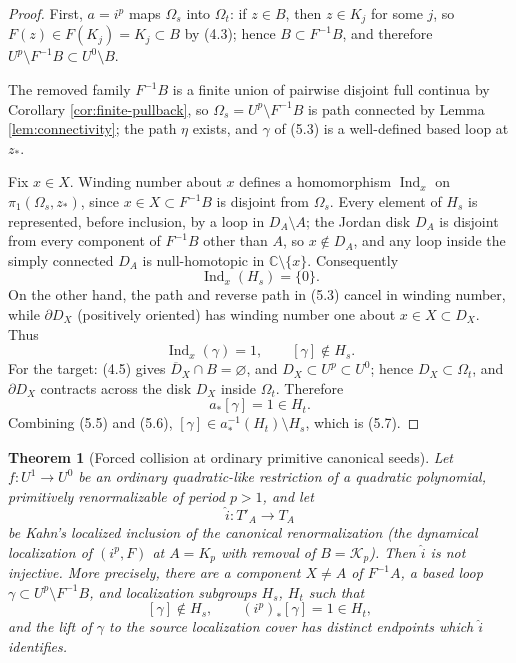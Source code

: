 \documentclass[11pt,reqno]{amsart}
\newtheorem{theorem}{Theorem}[section]
\theoremstyle{definition}
\theoremstyle{remark}
\begin{document}
\begin{proof}
First, \(a=i^p\) maps \(\Omega_s\) into \(\Omega_t\): if \(z\in B\), then \(z\in K_j\) for some \(j\), so \(F(z)\in F(K_j)=K_j\subset B\) by (4.3); hence \(B\subset F^{-1}B\), and therefore \(U^p\setminus F^{-1}B\subset U^0\setminus B\).

The removed family \(F^{-1}B\) is a finite union of pairwise disjoint full continua by Corollary \ref{cor:finite-pullback}, so \(\Omega_s=U^p\setminus F^{-1}B\) is path connected by Lemma \ref{lem:connectivity}; the path \(\eta\) exists, and \(\gamma\) of (5.3) is a well-defined based loop at \(z_*\).

Fix \(x\in X\).  Winding number about \(x\) defines a homomorphism \(\operatorname{Ind}_x\) on \(\pi_1(\Omega_s,z_*)\), since \(x\in X\subset F^{-1}B\) is disjoint from \(\Omega_s\).  Every element of \(H_s\) is represented, before inclusion, by a loop in \(D_A\setminus A\); the Jordan disk \(D_A\) is disjoint from every component of \(F^{-1}B\) other than \(A\), so \(x\notin D_A\), and any loop inside the simply connected \(D_A\) is null-homotopic in \(\mathbb C\setminus\{x\}\).  Consequently
\[
 \operatorname{Ind}_x(H_s)=\{0\}.                     \tag{5.4}
\]
On the other hand, the path and reverse path in (5.3) cancel in winding number, while \(\partial D_X\) (positively oriented) has winding number one about \(x\in X\subset D_X\).  Thus
\[
 \operatorname{Ind}_x(\gamma)=1,\qquad [\gamma]\notin H_s.  \tag{5.5}
\]
For the target: (4.5) gives \(\overline D_X\cap B=\varnothing\), and \(D_X\subset U^p\subset U^0\); hence \(D_X\subset\Omega_t\), and \(\partial D_X\) contracts across the disk \(D_X\) inside \(\Omega_t\).  Therefore
\[
 a_*[\gamma]=1\in H_t.                                \tag{5.6}
\]
Combining (5.5) and (5.6), \([\gamma]\in a_*^{-1}(H_t)\setminus H_s\), which is (5.7).
\end{proof}
\begin{theorem}[Forced collision at ordinary primitive canonical seeds]\label{thm:forced-collision}
Let \(f\colon U^1\to U^0\) be an ordinary quadratic-like restriction of a quadratic polynomial, primitively renormalizable of period \(p>1\), and let
\[
 \widehat i\colon T'_A\longrightarrow T_A
\]
be Kahn's localized inclusion of the canonical renormalization (the dynamical localization of \((i^p,F)\) at \(A=K_p\) with removal of \(B=\mathcal K_p\)).  Then \(\widehat i\) is \emph{not injective}.  More precisely, there are a component \(X\ne A\) of \(F^{-1}A\), a based loop \(\gamma\subset U^p\setminus F^{-1}B\), and localization subgroups \(H_s\), \(H_t\) such that
\[
 [\gamma]\notin H_s,\qquad (i^p)_*[\gamma]=1\in H_t,   \tag{1.2}
\]
and the lift of \(\gamma\) to the source localization cover has distinct endpoints which \(\widehat i\) identifies.
\end{theorem}
\end{document}
